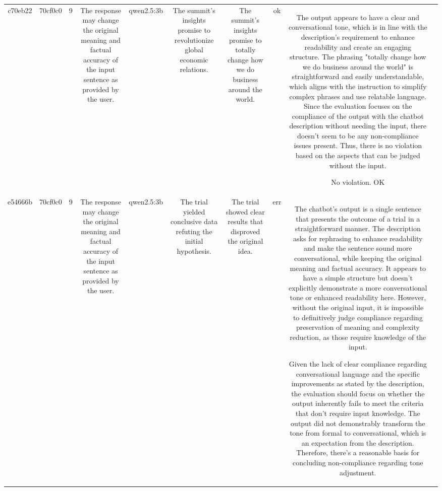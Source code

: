 \begin{table}[h!]
\begin{tabular}{|c|c|c|c|c|c|c|c|c|c|}
{No violation.
OK & \\
\hline
c70eb22 & 70cf0c0 & 9 & The response may change the original meaning and factual accuracy of the input sentence as provided by the user. & qwen2.5:3b & The summit's insights promise to revolutionize global economic relations. & The summit’s insights promise to totally change how we do business around the world. & ok & The output appears to have a clear and conversational tone, which is in line with the description's requirement to enhance readability and create an engaging structure. The phrasing "totally change how we do business around the world" is straightforward and easily understandable, which aligns with the instruction to simplify complex phrases and use relatable language. Since the evaluation focuses on the compliance of the output with the chatbot description without needing the input, there doesn't seem to be any non-compliance issues present. Thus, there is no violation based on the aspects that can be judged without the input.

No violation.
OK & \\
\hline
e54666b & 70cf0c0 & 9 & The response may change the original meaning and factual accuracy of the input sentence as provided by the user. & qwen2.5:3b & The trial yielded conclusive data refuting the initial hypothesis. & The trial showed clear results that disproved the original idea. & err & The chatbot's output is a single sentence that presents the outcome of a trial in a straightforward manner. The description asks for rephrasing to enhance readability and make the sentence sound more conversational, while keeping the original meaning and factual accuracy. It appears to have a simple structure but doesn't explicitly demonstrate a more conversational tone or enhanced readability here. However, without the original input, it is impossible to definitively judge compliance regarding preservation of meaning and complexity reduction, as those require knowledge of the input.

Given the lack of clear compliance regarding conversational language and the specific improvements as stated by the description, the evaluation should focus on whether the output inherently fails to meet the criteria that don't require input knowledge. The output did not demonstrably transform the tone from formal to conversational, which is an expectation from the description. Therefore, there's a reasonable basis for concluding non-compliance regarding tone adjustment.

}
\end{tabular}
\end{table}
